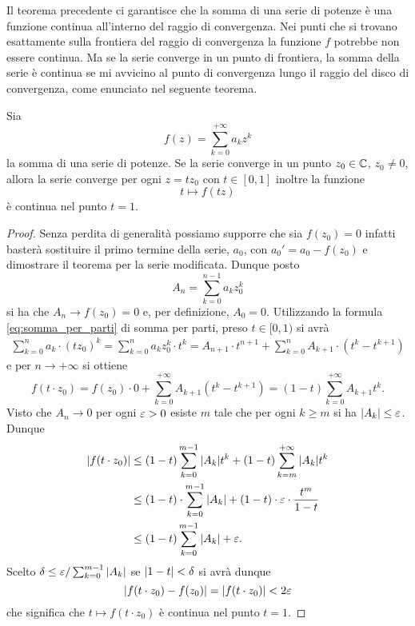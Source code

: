 Il teorema precedente ci garantisce che la somma di una serie di potenze
è una funzione continua all'interno del raggio di convergenza.
Nei punti che si trovano esattamente sulla frontiera del raggio di convergenza
la funzione $f$ potrebbe non essere continua.
Ma se la serie converge in un
punto di frontiera, la somma della serie è continua se mi avvicino al punto di
convergenza lungo il raggio del disco di convergenza, come enunciato nel seguente teorema.

\begin{theorem}
\mymark{*}
\label{th:lemma_abel}
Sia
\[
  f(z) = \sum_{k=0}^{+\infty} a_k z^k
\]
la somma di una serie di potenze. Se la serie converge in un punto $z_0\in \mathbb C$, $z_0\neq 0$, allora la serie converge per ogni $z=t z_0$ con $t\in [0,1]$ inoltre la funzione
\[
  t \mapsto f(tz)
\]
è continua nel punto $t=1$.
\end{theorem}
%
\begin{proof}
Senza perdita di generalità possiamo supporre che sia $f(z_0)=0$ infatti basterà sostituire il primo termine della serie, $a_0$, con $a_0' = a_0 - f(z_0)$ e dimostrare il teorema per la serie modificata.
Dunque posto
\[
  A_n = \sum_{k=0}^{n-1} a_k z_0^k
\]
si ha che $A_n \to f(z_0) = 0$ e, per definizione, $A_0 = 0$.
Utilizzando la formula \eqref{eq:somma_per_parti} di somma per parti, preso $t\in [0,1)$
si avrà
\begin{align*}
\sum_{k=0}^n a_k \cdot (tz_0)^k
= \sum_{k=0}^n a_k z_0^k \cdot t^k
= A_{n+1} \cdot t^{n+1} + \sum_{k=0}^n A_{k+1}\cdot (t^k - t^{k+1})
\end{align*}
e per $n\to +\infty$ si ottiene
\[
  f(t\cdot z_0) = f(z_0)\cdot 0 + \sum_{k=0}^{+\infty}A_{k+1}(t^k-t^{k+1})
  = (1-t)\sum_{k=0}^{+\infty} A_{k+1} t^k.
\]
Visto che $A_n \to 0$ per ogni $\varepsilon>0$ esiste $m$ tale che per ogni $k\ge m$ si ha ${\left|A_k\right|} \le  \varepsilon$. Dunque
\begin{align*}
{\left|f(t\cdot z_0)\right|}
 &\le (1-t)\sum_{k=0}^{m-1} {\left|A_k\right|} t^k
  + (1-t)\sum_{k=m}^{+\infty} {\left|A_k\right|} t^k \\
 &\le (1-t)\cdot \sum_{k=0}^{m-1}{\left|A_k\right|} + (1-t)\cdot \varepsilon \cdot \frac{t^m}{1-t} \\
 &\le (1-t)\sum_{k=0}^{m-1}{\left|A_k\right|} + \varepsilon.
\end{align*}
Scelto $\delta \le \varepsilon / \sum_{k=0}^{m-1} {\left|A_k\right|}$ se ${\left|1-t\right|}<\delta$ si avrà
dunque
\[
  {\left|f(t\cdot z_0)-f(z_0)\right|} = {\left|f(t\cdot z_0)\right|} < 2\varepsilon
\]
che significa che $t\mapsto f(t\cdot z_0)$ è continua nel punto $t=1$.
\end{proof}


